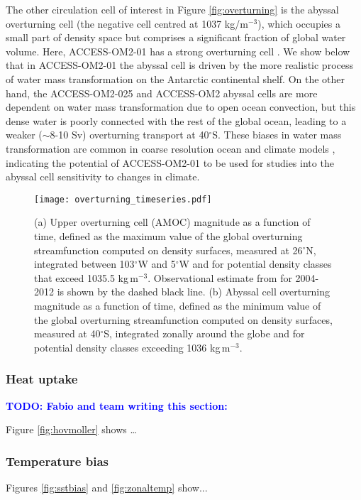 \documentclass[gmd, manuscript]{copernicus}
\newcommand{\TODO}[1]{\textcolor{blue}{\textsf{\textbf{TODO: #1}}}}
\begin{document}
The other circulation cell of interest in Figure \ref{fig:overturning} is the abyssal overturning cell (the negative cell centred at 1037 kg/m$^{-3}$), which occupies a small part of density space but comprises a significant fraction of global water volume.
Here, ACCESS-OM2-01 has a strong overturning cell \citep[10--15\,Sv at $40^\circ$S, see figure \ref{fig:overturning_timeseries}b; compared with poorly constrained observational estimates of 20--50,Sv;][]{Sloyan2001,Lumpkin2007,Talley2013}.
We show below that in ACCESS-OM2-01 the abyssal cell is driven by the more realistic process of water mass transformation on the Antarctic continental shelf.
On the other hand, the ACCESS-OM2-025 and ACCESS-OM2 abyssal cells are more dependent on water mass transformation due to open ocean convection, but this dense water is poorly connected with the rest of the global ocean, leading to a weaker ($\sim$8-10 Sv) overturning transport at 40$^\circ$S.
These biases in water mass transformation are common in coarse resolution ocean and climate models \citep{Heuze2015}, indicating the potential of ACCESS-OM2-01 to be used for studies into the abyssal cell sensitivity to changes in climate.

\begin{figure}[t]
\texttt{[image: overturning\_timeseries.pdf]}
\caption{
(a) Upper overturning cell (AMOC) magnitude as a function of time, defined as the maximum value of the global overturning streamfunction computed on density surfaces, measured at 26$^\circ$N, integrated between 103$^\circ$W and 5$^\circ$W and for potential density classes that exceed 1035.5 kg\,m$^{-3}$. Observational estimate from \citet{McCarthy:2015} for 2004-2012 is shown by the dashed black line. (b) Abyssal cell overturning magnitude as a function of time, defined as the minimum value of the global overturning streamfunction computed on density surfaces, measured at 40$^\circ$S, integrated zonally around the globe and for potential density classes exceeding 1036 kg\,m$^{-3}$. \label{fig:overturning_timeseries}}
\end{figure}


\subsubsection{Heat uptake}
\TODO{Fabio and team writing this section:} 

Figure \ref{fig:hovmoller} shows \ldots

\subsubsection{Temperature bias}
Figures \ref{fig:sstbias} and \ref{fig:zonaltemp} show...
\end{document}
